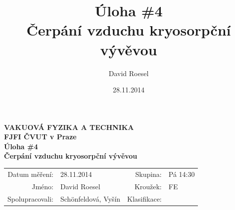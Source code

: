 \documentclass[english]{article}
\newcommand{\Author}{David Roesel}
\newcommand{\Coauthor}{Schönfeldová, Vyšín}
\newcommand{\Institute}{FJFI ČVUT v Praze}
\newcommand{\Subject}{VAKUOVÁ FYZIKA A TECHNIKA}
\newcommand{\Group}{Pá 14:30}
\newcommand{\Kruh}{FE}
\newcommand{\Title}{Úloha \#4  \\Čerpání vzduchu kryosorpční vývěvou}
\newcommand{\Date}{28.11.2014}
\begin{document}
\author{\Author}
\title{\Title}
\date{\Date}

\renewcommand{\figurename}{Obr.}
\renewcommand{\tablename}{Tab.}
\renewcommand{\refname}{Reference}


\setlength{\parindent}{0cm}
\begin{multicols}{2}
\textbf{\Subject \\
        \Institute \\[0.1cm]
\Title \\[0.5cm]
}
\begin{tabular}{rlrl}
\large Datum měření: & \Date & \large Skupina: & \Group \\
\large Jméno: & \Author & \large Kroužek:  & \Kruh\\
\large Spolupracovali: & \Coauthor &\large Klasifikace:\\
\end{tabular}


\end{multicols}
\end{document}
